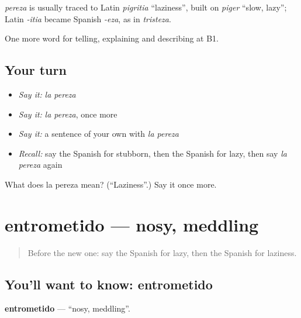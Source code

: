 \begin{cousinweb}
\emph{pereza} is usually traced to Latin \emph{pigritia} \textquotedblleft{}laziness\textquotedblright{}, built on \emph{piger} \textquotedblleft{}slow, lazy\textquotedblright{}; Latin \emph{-itia} became Spanish \emph{-eza}, as in \emph{tristeza}.
\end{cousinweb}

\begin{grammarlens}[title={What you've built}]
One more word for telling, explaining and describing at B1.
\end{grammarlens}

\subsection*{Your turn}
\begin{itemize}
\raggedright
  \item \emph{Say it:} \emph{la pereza}
  \item \emph{Say it:} \emph{la pereza}, once more
  \item \emph{Say it:} a sentence of your own with \emph{la pereza}
  \item \emph{Recall:} say the Spanish for stubborn, then the Spanish for lazy, then say \emph{la pereza} again
\end{itemize}

\begin{tcolorbox}[breakable,colback=teal!4,colframe=teal!35!black,title={Before you move on}]
What does la pereza mean? (\textquotedblleft{}Laziness\textquotedblright{}.) Say it once more.
\end{tcolorbox}
\section[entrometido]{entrometido — nosy, meddling}

\label{lesson:ES-C729-entrometido}



\begin{quote}
Before the new one: say the Spanish for lazy, then the Spanish for laziness.
\end{quote}

\subsection*{You'll want to know: entrometido}
\textbf{entrometido} — \textquotedblleft{}nosy, meddling\textquotedblright{}.

